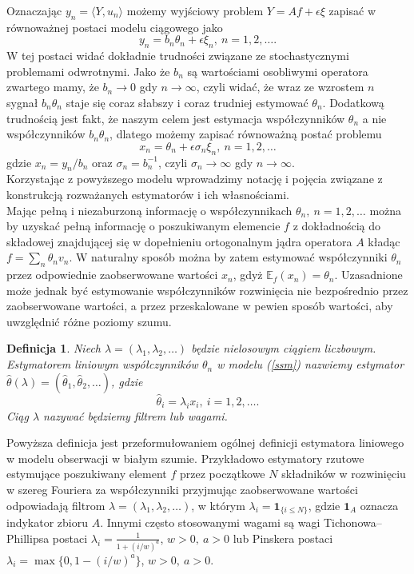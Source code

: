 \documentclass{mwart}
\newtheorem{df}{Definicja}
\begin{document}
Oznaczając $y_n=\langle Y,u_n\rangle$ możemy wyjściowy problem $Y=Af+\epsilon\xi$ zapisać w równoważnej postaci modelu ciągowego jako
\begin{displaymath}
y_n=b_n\theta_n+\epsilon\xi_n,\ n=1,2,\dots.
\end{displaymath}
W tej postaci widać dokładnie trudności związane ze stochastycznymi problemami odwrotnymi. Jako że $b_n$ są wartościami osobliwymi operatora zwartego mamy, że $b_n\to 0$ gdy $n\to \infty$, czyli widać, że wraz ze wzrostem $n$ sygnał $b_n\theta_n$ staje się coraz słabszy i coraz trudniej estymować $\theta_n$. Dodatkową trudnością jest fakt, że naszym celem jest estymacja współczynników $\theta_n$ a nie współczynników $b_n\theta_n$, dlatego możemy zapisać równoważną postać problemu
\begin{equation}\label{ssm}
x_n=\theta_n+\epsilon\sigma_n\xi_n,\ n=1,2,\dots
\end{equation}
gdzie $x_n=y_n/b_n$ oraz $\sigma_n=b_n^{-1}$, czyli $\sigma_n\to \infty$ gdy $n\to \infty$. \\

Korzystając z powyższego modelu wprowadzimy notację i pojęcia związane z konstrukcją rozważanych estymatorów i ich własnościami.\\
Mając pełną i niezaburzoną informację o współczynnikach $\theta_n,\ n=1,2,\dots$ można by uzyskać pełną informację o poszukiwanym elemencie $f$ z dokładnością do składowej znajdującej się w dopełnieniu ortogonalnym jądra operatora $A$ kładąc $f=\sum_n\theta_nv_n$. W naturalny sposób można by zatem estymować współczynniki $\theta_n$ przez odpowiednie zaobserwowane wartości $x_n$, gdyż $\mathbb{E}_f(x_n)=\theta_n$. Uzasadnione może jednak być estymowanie współczynników rozwinięcia nie bezpośrednio przez zaobserwowane wartości, a przez przeskalowane w pewien sposób wartości, aby uwzględnić różne poziomy szumu. 
\begin{df}
Niech $\lambda=(\lambda_1,\lambda_2,\dots)$ będzie nielosowym ciągiem liczbowym. Estymatorem liniowym współczynników $\theta_n$ w modelu (\ref{ssm}) nazwiemy estymator $\hat{\theta}(\lambda)=(\hat{\theta}_1,\hat{\theta}_2,\dots)$, gdzie
\begin{displaymath}
\hat{\theta}_i=\lambda_ix_i,\ i=1,2,\dots.
\end{displaymath}
Ciąg $\lambda$ nazywać będziemy filtrem lub wagami.
\end{df}
Powyższa definicja jest przeformułowaniem ogólnej definicji estymatora liniowego w modelu obserwacji w białym szumie. 
Przykładowo estymatory rzutowe estymujące poszukiwany element $f$ przez początkowe $N$ składników w rozwinięciu w szereg Fouriera za współczynniki przyjmując zaobserwowane wartości odpowiadają filtrom $\lambda=(\lambda_1,\lambda_2,\dots)$, w którym $\lambda_i=\pmb{1}_{\{i\leq N\}}$, gdzie $\pmb{1}_A$ oznacza indykator zbioru $A$. Innymi często stosowanymi wagami są wagi Tichonowa-- Phillipsa postaci $\lambda_i=\frac{1}{1+(i/w)^a}$, $w>0,\ a>0$ lub Pinskera postaci $\lambda_i=\max\{0,1-(i/w)^a\}$, $w>0,\ a>0$. \\
\end{document}
